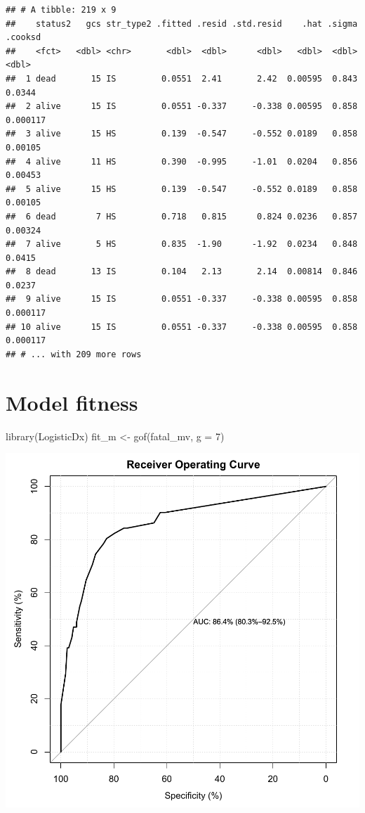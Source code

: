 \documentclass[
]{book}
\makeatletter
\newenvironment{Shaded}{\begin{snugshade}}{\end{snugshade}}
\newcommand{\AttributeTok}[1]{\textcolor[rgb]{0.61,0.61,0.61}{#1}}
\newcommand{\DecValTok}[1]{\textcolor[rgb]{0.06,0.06,0.06}{#1}}
\newcommand{\FunctionTok}[1]{\textcolor[rgb]{0,0,0}{#1}}
\newcommand{\NormalTok}[1]{#1}
\newcommand{\OtherTok}[1]{\textcolor[rgb]{0.37,0.37,0.37}{#1}}
\newenvironment{kframe}{%
\medskip{}
\setlength{\fboxsep}{.8em}
 \def\at@end@of@kframe{}%
 \ifinner\ifhmode%
  \def\at@end@of@kframe{\end{minipage}}%
  \begin{minipage}{\columnwidth}%
 \fi\fi%
 \def\FrameCommand##1{\hskip\@totalleftmargin \hskip-\fboxsep
 \colorbox{shadecolor}{##1}\hskip-\fboxsep
     \hskip-\linewidth \hskip-\@totalleftmargin \hskip\columnwidth}%
 \MakeFramed {\advance\hsize-\width
   \@totalleftmargin\z@ \linewidth\hsize
   \@setminipage}}%
 {\par\unskip\endMakeFramed%
 \at@end@of@kframe}
\renewenvironment{Shaded}{\begin{kframe}}{\end{kframe}}
\makeatother
\begin{document}
\begin{verbatim}
## # A tibble: 219 x 9
##    status2   gcs str_type2 .fitted .resid .std.resid    .hat .sigma  .cooksd
##    <fct>   <dbl> <chr>       <dbl>  <dbl>      <dbl>   <dbl>  <dbl>    <dbl>
##  1 dead       15 IS         0.0551  2.41       2.42  0.00595  0.843 0.0344  
##  2 alive      15 IS         0.0551 -0.337     -0.338 0.00595  0.858 0.000117
##  3 alive      15 HS         0.139  -0.547     -0.552 0.0189   0.858 0.00105 
##  4 alive      11 HS         0.390  -0.995     -1.01  0.0204   0.856 0.00453 
##  5 alive      15 HS         0.139  -0.547     -0.552 0.0189   0.858 0.00105 
##  6 dead        7 HS         0.718   0.815      0.824 0.0236   0.857 0.00324 
##  7 alive       5 HS         0.835  -1.90      -1.92  0.0234   0.848 0.0415  
##  8 dead       13 IS         0.104   2.13       2.14  0.00814  0.846 0.0237  
##  9 alive      15 IS         0.0551 -0.337     -0.338 0.00595  0.858 0.000117
## 10 alive      15 IS         0.0551 -0.337     -0.338 0.00595  0.858 0.000117
## # ... with 209 more rows
\end{verbatim}

\hypertarget{model-fitness}{%
\section{Model fitness}\label{model-fitness}}

\begin{Shaded}
\begin{Highlighting}[]
\FunctionTok{library}\NormalTok{(LogisticDx)}
\NormalTok{fit\_m }\OtherTok{\textless{}{-}} \FunctionTok{gof}\NormalTok{(fatal\_mv, }\AttributeTok{g =} \DecValTok{7}\NormalTok{)}
\end{Highlighting}
\end{Shaded}

\begin{center}\includegraphics[width=0.7\linewidth,keepaspectratio]{Multivariable_Data_Analysis_files/figure-latex/unnamed-chunk-155-1} \end{center}
\end{document}

